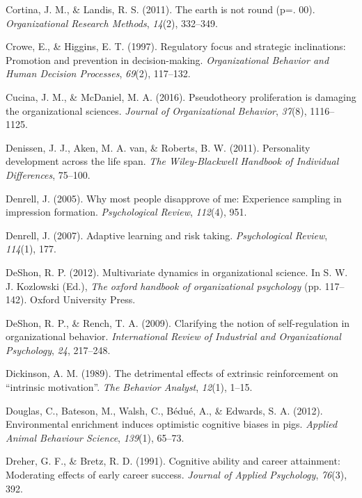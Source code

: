 \documentclass[english,,man]{apa6}
\theoremstyle{definition}
\theoremstyle{definition}
\theoremstyle{definition}
\theoremstyle{remark}
\begin{document}
\leavevmode\hypertarget{ref-Cortina2011}{}%
Cortina, J. M., \& Landis, R. S. (2011). The earth is not round (p=.
00). \emph{Organizational Research Methods}, \emph{14}(2), 332--349.

\leavevmode\hypertarget{ref-crowe1997}{}%
Crowe, E., \& Higgins, E. T. (1997). Regulatory focus and strategic
inclinations: Promotion and prevention in decision-making.
\emph{Organizational Behavior and Human Decision Processes},
\emph{69}(2), 117--132.

\leavevmode\hypertarget{ref-Cucina2016}{}%
Cucina, J. M., \& McDaniel, M. A. (2016). Pseudotheory proliferation is
damaging the organizational sciences. \emph{Journal of Organizational
Behavior}, \emph{37}(8), 1116--1125.

\leavevmode\hypertarget{ref-denissen2011}{}%
Denissen, J. J., Aken, M. A. van, \& Roberts, B. W. (2011). Personality
development across the life span. \emph{The Wiley-Blackwell Handbook of
Individual Differences}, 75--100.

\leavevmode\hypertarget{ref-denrell2005}{}%
Denrell, J. (2005). Why most people disapprove of me: Experience
sampling in impression formation. \emph{Psychological Review},
\emph{112}(4), 951.

\leavevmode\hypertarget{ref-denrell2007adaptive}{}%
Denrell, J. (2007). Adaptive learning and risk taking.
\emph{Psychological Review}, \emph{114}(1), 177.

\leavevmode\hypertarget{ref-DeShon2012}{}%
DeShon, R. P. (2012). Multivariate dynamics in organizational science.
In S. W. J. Kozlowski (Ed.), \emph{The oxford handbook of organizational
psychology} (pp. 117--142). Oxford University Press.

\leavevmode\hypertarget{ref-deshon2009}{}%
DeShon, R. P., \& Rench, T. A. (2009). Clarifying the notion of
self-regulation in organizational behavior. \emph{International Review
of Industrial and Organizational Psychology}, \emph{24}, 217--248.

\leavevmode\hypertarget{ref-dickinson1989}{}%
Dickinson, A. M. (1989). The detrimental effects of extrinsic
reinforcement on ``intrinsic motivation''. \emph{The Behavior Analyst},
\emph{12}(1), 1--15.

\leavevmode\hypertarget{ref-douglas2012}{}%
Douglas, C., Bateson, M., Walsh, C., Bédué, A., \& Edwards, S. A.
(2012). Environmental enrichment induces optimistic cognitive biases in
pigs. \emph{Applied Animal Behaviour Science}, \emph{139}(1), 65--73.

\leavevmode\hypertarget{ref-dreher1991}{}%
Dreher, G. F., \& Bretz, R. D. (1991). Cognitive ability and career
attainment: Moderating effects of early career success. \emph{Journal of
Applied Psychology}, \emph{76}(3), 392.
\end{document}
